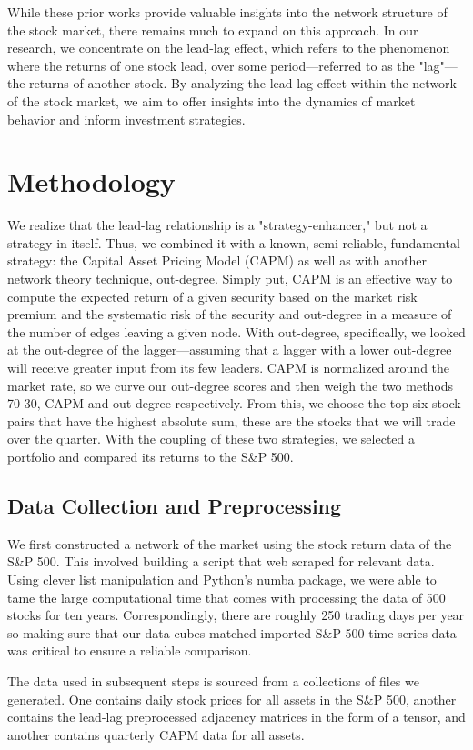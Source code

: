 \documentclass{article}
\begin{document}
While these prior works provide valuable insights into the network structure of the stock market, there remains much to expand on this approach. In our research, we concentrate on the lead-lag effect, which refers to the phenomenon where the returns of one stock lead, over some period---referred to as the "lag"---the returns of another stock. By analyzing the lead-lag effect within the network of the stock market, we aim to offer insights into the dynamics of market behavior and inform investment strategies.
\section{Methodology}
We realize that the lead-lag relationship is a "strategy-enhancer," but not a strategy in itself. Thus, we combined it with a known, semi-reliable, fundamental strategy: the  Capital Asset Pricing Model (CAPM) as well as with another network theory technique, out-degree. Simply put, CAPM is an effective way to compute the expected return of a given security based on the market risk premium and the systematic risk of the security and out-degree in a measure of the number of edges leaving a given node. With out-degree, specifically, we looked at the out-degree of the lagger---assuming that a lagger with a lower out-degree will receive greater input from its few leaders. CAPM is normalized around the market rate, so we curve our out-degree scores and then weigh the two methods 70-30, CAPM and out-degree respectively. From this, we choose the top six stock pairs that have the highest absolute sum, these are the stocks that we will trade over the quarter. With the coupling of these two strategies, we selected a portfolio and compared its returns to the S\&P 500.
\subsection{Data Collection and Preprocessing}
We first constructed a network of the market using the stock return data of the S\&P 500. This involved building a script that web scraped for relevant data. Using clever list manipulation and Python's  {\selectfont
numba} package, we were able to tame the large computational time that comes with processing the data of 500 stocks for ten years. Correspondingly, there are roughly 250 trading days per year so making sure that our data cubes matched imported S$\&$P 500 time series data was critical to ensure a reliable comparison.

The data used in subsequent steps is sourced from a collections of files we generated. One contains daily stock prices for all assets in the S$\&$P 500, another contains the lead-lag preprocessed adjacency matrices in the form of a tensor, and another contains quarterly CAPM data for all assets.
\end{document}
